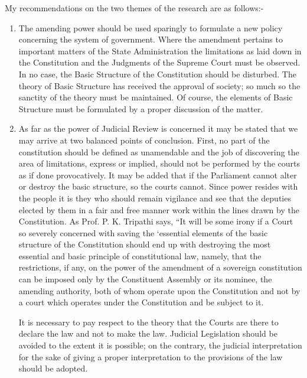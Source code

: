 \begin{multicols}{2}
\noi
{}

\noi
My recommendations on the two themes of the research are as follows:-

\begin{enumerate}

\item The amending power should be used sparingly to formulate a new policy
concerning the system of government. Where the amendment pertains to important
matters of the State Administration the limitations as laid down in the Constitution
and the Judgments of the Supreme Court must be observed. In no case, the Basic
Structure of the Constitution should be disturbed. The theory of Basic Structure has
received the approval of society; so much so the sanctity of the theory must be
maintained. Of course, the elements of Basic Structure must be formulated by a
proper discussion of the matter.

\vspace{-.1cm}

\item As far as the power of Judicial Review is concerned it may be stated that we may
arrive at two balanced points of conclusion. First, no part of the constitution should
be defined as unamendable and the job of discovering the area of limitations,
express or implied, should not be performed by the courts as if done provocatively.
It may be added that if the Parliament cannot alter or destroy the basic structure, so
the courts cannot. Since power resides with the people it is they who should remain
vigilance and see that the deputies elected by them in a fair and free manner work
within the lines drawn by the Constitution. As Prof. P. K. Tripathi says, “It will be
some irony if a Court so severely concerned with saving the ‘essential elements of
the basic structure of the Constitution should end up with destroying the most
essential and basic principle of constitutional law, namely, that the restrictions, if
any, on the power of the amendment of a sovereign constitution can be imposed
only by the Constituent Assembly or its nominee, the amending authority, both of
whom operate upon the Constitution and not by a court which operates under the
Constitution and be subject to it.\\ 

\vspace{-.3cm} 
  
It is necessary to pay respect to the theory that the Courts are there to declare the law
and not to make the law. Judicial Legislation should be avoided to the extent it is
possible; on the contrary, the judicial interpretation for the sake of giving a proper
interpretation to the provisions of the law should be adopted.



\end{enumerate}
\end{multicols}
\label{end2016-art2}
